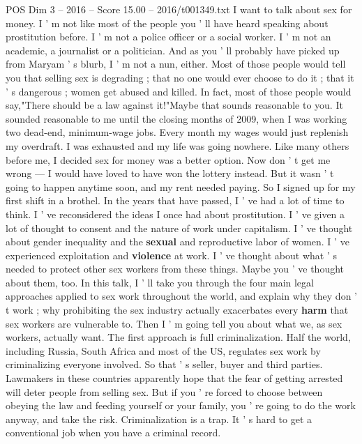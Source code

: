 \begin{textsample}{POS Dim 3 – 2016 – Score 15.00 – 2016/t001349.txt}  \label{ex:f3_pos_009}
I want to talk about sex for money.
I ' m not like most of the people you ' ll have heard speaking about prostitution before.
I ' m not a police officer or a social worker.
I ' m not an academic, a journalist or a politician.
And as you ' ll probably have picked up from Maryam ' s blurb, I ' m not a nun, either.
Most of those people would tell you that selling sex is degrading ; that no one would ever choose to do it ; that it ' s dangerous ; women get abused and killed.
In fact, most of those people would say,"There should be a law against it!"Maybe that sounds reasonable to you.
It sounded reasonable to me until the closing months of 2009, when I was working two dead-end, minimum-wage jobs.
Every month my wages would just replenish my overdraft.
I was exhausted and my life was going nowhere.
Like many others before me, I decided sex for money was a better option.
Now don ' t get me wrong — I would have loved to have won the lottery instead.
But it wasn ' t going to happen anytime soon, and my rent needed paying.
So I signed up for my first shift in a brothel.
In the years that have passed, I ' ve had a lot of time to think.
I ' ve reconsidered the ideas I once had about prostitution.
I ' ve given a lot of thought to consent and the nature of work under capitalism.
I ' ve thought about gender inequality and the \textbf{sexual} and reproductive labor of women.
I ' ve experienced exploitation and \textbf{violence} at work.
I ' ve thought about what ' s needed to protect other sex workers from these things.
Maybe you ' ve thought about them, too.
In this talk, I ' ll take you through the four main legal approaches applied to sex work throughout the world, and explain why they don ' t work ; why prohibiting the sex industry actually exacerbates every \textbf{harm} that sex workers are vulnerable to.
Then I ' m going tell you about what we, as sex workers, actually want.
The first approach is full criminalization.
Half the world, including Russia, South Africa and most of the US, regulates sex work by criminalizing everyone involved.
So that ' s seller, buyer and third parties.
Lawmakers in these countries apparently hope that the fear of getting arrested will deter people from selling sex.
But if you ' re forced to choose between obeying the law and feeding yourself or your family, you ' re going to do the work anyway, and take the risk.
Criminalization is a trap.
It ' s hard to get a conventional job when you have a criminal record.

\end{textsample}
